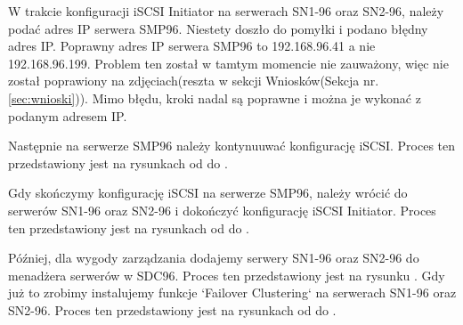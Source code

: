 
W trakcie konfiguracji iSCSI Initiator na serwerach SN1-96 oraz SN2-96, należy podać adres IP serwera SMP96. Niestety doszło do pomyłki i podano błędny adres IP. Poprawny adres IP serwera SMP96 to 192.168.96.41 a nie 192.168.96.199. Problem ten został w tamtym momencie nie zauważony, więc nie został poprawiony na zdjęciach(reszta w sekcji Wniosków(Sekcja nr.\ref{sec:wnioski})). Mimo błędu, kroki nadal są poprawne i można je wykonać z podanym adresem IP.

\clearpage

Następnie na serwerze SMP96 należy kontynuuwać konfigurację iSCSI. Proces ten przedstawiony jest na rysunkach od  do .


\clearpage


\clearpage


\clearpage


\clearpage

Gdy skończymy konfigurację iSCSI na serwerze SMP96, należy wrócić do serwerów SN1-96 oraz SN2-96 i dokończyć konfigurację iSCSI Initiator. Proces ten przedstawiony jest na rysunkach od  do .


\clearpage


\clearpage

Później, dla wygody zarządzania dodajemy serwery SN1-96 oraz SN2-96 do menadżera serwerów w SDC96. Proces ten przedstawiony jest na rysunku . Gdy już to zrobimy instalujemy funkcje `Failover Clustering` na serwerach SN1-96 oraz SN2-96. Proces ten przedstawiony jest na rysunkach od  do .

